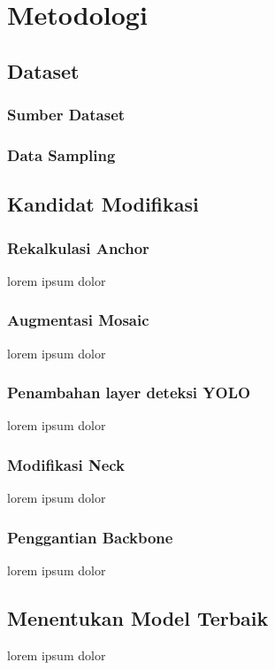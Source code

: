 \section{Metodologi}
    \subsection{Dataset}
        \subsubsection{Sumber Dataset}
        \subsubsection{Data Sampling}
    \subsection{Kandidat Modifikasi}
        \subsubsection{Rekalkulasi Anchor}
            lorem ipsum dolor
        \subsubsection{Augmentasi Mosaic}
            lorem ipsum dolor
        \subsubsection{Penambahan layer deteksi YOLO}
            lorem ipsum dolor
        \subsubsection{Modifikasi Neck}
            lorem ipsum dolor
        \subsubsection{Penggantian Backbone}
            lorem ipsum dolor
    \subsection{Menentukan Model Terbaik}
        lorem ipsum dolor
    